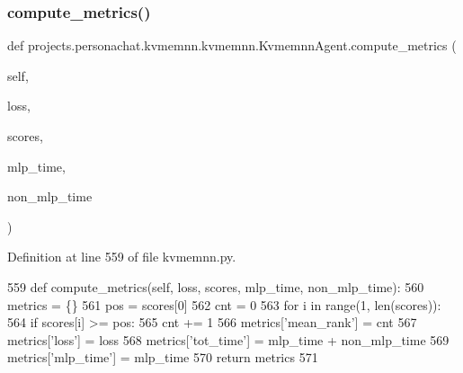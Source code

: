 \mbox{\label{classprojects_1_1personachat_1_1kvmemnn_1_1kvmemnn_1_1KvmemnnAgent_ac64d59e43aa1ca2b874c7e736bd3a93d}} 
\subsubsection{\texorpdfstring{compute\+\_\+metrics()}{compute\_metrics()}}
{\footnotesize\ttfamily def projects.\+personachat.\+kvmemnn.\+kvmemnn.\+Kvmemnn\+Agent.\+compute\+\_\+metrics (\begin{DoxyParamCaption}\item[{}]{self,  }\item[{}]{loss,  }\item[{}]{scores,  }\item[{}]{mlp\+\_\+time,  }\item[{}]{non\+\_\+mlp\+\_\+time }\end{DoxyParamCaption})}



Definition at line 559 of file kvmemnn.\+py.


\begin{DoxyCode}
559     \textcolor{keyword}{def }compute\_metrics(self, loss, scores, mlp\_time, non\_mlp\_time):
560         metrics = \{\}
561         pos = scores[0]
562         cnt = 0
563         \textcolor{keywordflow}{for} i \textcolor{keywordflow}{in} range(1, len(scores)):
564             \textcolor{keywordflow}{if} scores[i] >= pos:
565                 cnt += 1
566         metrics[\textcolor{stringliteral}{'mean\_rank'}] = cnt
567         metrics[\textcolor{stringliteral}{'loss'}] = loss
568         metrics[\textcolor{stringliteral}{'tot\_time'}] = mlp\_time + non\_mlp\_time
569         metrics[\textcolor{stringliteral}{'mlp\_time'}] = mlp\_time
570         \textcolor{keywordflow}{return} metrics
571 
\end{DoxyCode}
\mbox{\label{classprojects_1_1personachat_1_1kvmemnn_1_1kvmemnn_1_1KvmemnnAgent_ab8a2b71536cfafcf4ed74a7a172ed81c}} 

